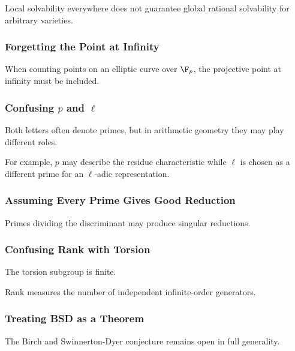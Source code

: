 Local solvability everywhere does not guarantee global rational solvability
for arbitrary varieties.

\subsubsection{Forgetting the Point at Infinity}

When counting points on an elliptic curve over \(\F_p\), the projective point
at infinity must be included.

\subsubsection{Confusing \(p\) and \(\ell\)}

Both letters often denote primes, but in arithmetic geometry they may play
different roles.

For example, \(p\) may describe the residue characteristic while \(\ell\)
is chosen as a different prime for an \(\ell\)-adic representation.

\subsubsection{Assuming Every Prime Gives Good Reduction}

Primes dividing the discriminant may produce singular reductions.

\subsubsection{Confusing Rank with Torsion}

The torsion subgroup is finite.

Rank measures the number of independent infinite-order generators.

\subsubsection{Treating BSD as a Theorem}

The Birch and Swinnerton-Dyer conjecture remains open in full generality.

